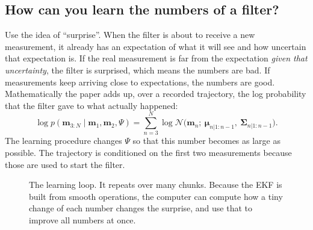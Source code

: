 \documentclass[11pt,a4paper]{article}
\begin{document}
\subsection{How can you learn the numbers of a filter?}
Use the idea of ``surprise''. When the filter is about to receive a new measurement, it already has
an expectation of what it will see and how uncertain that expectation is. If the real
measurement is far from the expectation \emph{given that uncertainty}, the filter is
surprised, which means the numbers are bad. If measurements keep arriving close to expectations,
the numbers are good. Mathematically the paper adds up, over a recorded trajectory, the log
probability that the filter gave to what actually happened:
\begin{equation}
\log p(\mathbf m_{3:N}\mid\mathbf m_1,\mathbf m_2,\Psi)
=\sum_{n=3}^{N}\log\mathcal N\big(\mathbf m_n;\ \boldsymbol\mu_{n|1:n-1},\ \boldsymbol\Sigma_{n|1:n-1}\big).
\tag{P7}\label{eq:loglik}
\end{equation}
\noindent The learning procedure changes $\Psi$ so that this number becomes as large as possible. The
trajectory is conditioned on the first two measurements because those are used to start the filter.

\begin{figure}[htbp]
\centering
{}
\caption{The learning loop. It repeats over many chunks. Because the EKF is built from smooth
operations, the computer can compute how a tiny change of each number changes the surprise, and
use that to improve all numbers at once.}
\end{figure}
\end{document}
